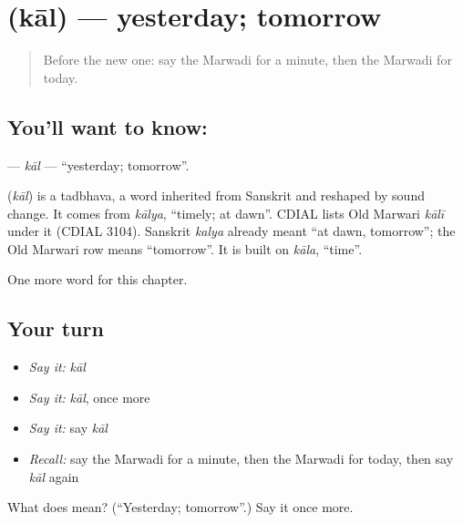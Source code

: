 \section[\texorpdfstring{\mw{काल} (kāl)}{काल (kāl)}]{ (kāl) — yesterday; tomorrow}

\label{lesson:MW-C79-kal}



\begin{quote}
Before the new one: say the Marwadi for a minute, then the Marwadi for today.
\end{quote}

\subsection*{You'll want to know: }
\textbf{} — \emph{kāl} — \textquotedblleft{}yesterday; tomorrow\textquotedblright{}.

\begin{cousinweb}
\textbf{} (\emph{kāl}) is a tadbhava, a word inherited from Sanskrit and reshaped by sound change. It comes from \emph{kālya}, \textquotedblleft{}timely; at dawn\textquotedblright{}. CDIAL lists Old Marwari \emph{kālī} under it (CDIAL 3104). Sanskrit \emph{kalya} already meant \textquotedblleft{}at dawn, tomorrow\textquotedblright{}; the Old Marwari row means \textquotedblleft{}tomorrow\textquotedblright{}. It is built on \emph{kāla}, \textquotedblleft{}time\textquotedblright{}.
\end{cousinweb}

\begin{grammarlens}[title={What you've built}]
One more word for this chapter.
\end{grammarlens}

\subsection*{Your turn}
\begin{itemize}
\raggedright
  \item \emph{Say it:} \emph{kāl}
  \item \emph{Say it:} \emph{kāl}, once more
  \item \emph{Say it:} say \emph{kāl}
  \item \emph{Recall:} say the Marwadi for a minute, then the Marwadi for today, then say \emph{kāl} again
\end{itemize}

\begin{tcolorbox}[breakable,colback=teal!4,colframe=teal!35!black,title={Before you move on}]
What does  mean? (\textquotedblleft{}Yesterday; tomorrow\textquotedblright{}.) Say it once more.
\end{tcolorbox}

